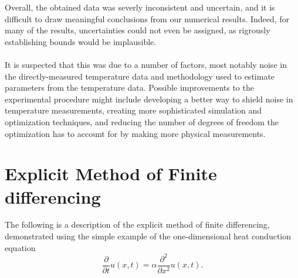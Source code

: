 \documentclass[letterpaper,titlepage,oneside]{report}
\begin{document}
Overall, the obtained data was severly inconsistent and uncertain,
and it is difficult to draw meaningful conclusions from our
numerical results. Indeed, for many of the results, uncertainties
could not even be assigned,
as rigrously establishing bounds would be implausible.
\\\\
It is suspected that this was due to a number of factors, most
notably noise in the directly-measured temperature data and
methodology used to estimate parameters from the temperature data.
Possible improvements to the experimental procedure might include
developing a better way to shield noise in temperature measurements,
creating more sophisticated simulation and optimization techniques,
and reducing the number of degrees of freedom the optimization has to
account for by making more physical measurements.

\appendix


\chapter{Explicit Method of Finite differencing}
\label{ch:finitediff}
The following is a description of the explicit method of
finite differencing, demonstrated
using the simple example of the one-dimensional heat conduction equation
\begin{equation}\label{eq:condsimp}
  \frac{\partial}{\partial t}u(x,t) = \alpha\frac{\partial^2}{\partial x^2}u(x,t).
\end{equation}
\end{document}
